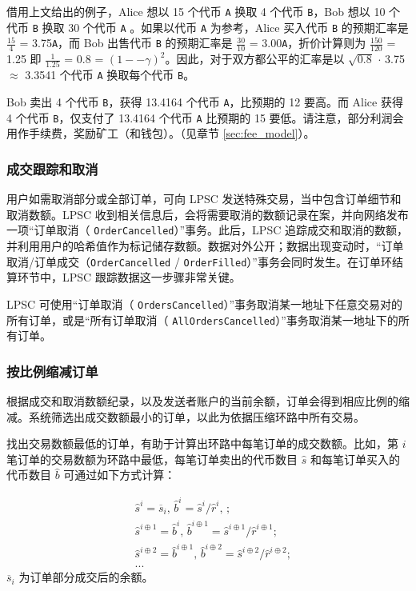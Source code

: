 \documentclass[UTF8,nofonts]{ctexart}%
\begin{document}
\begin{multicols}{2}
借用上文给出的例子，Alice 想以 15 个代币 \verb|A| 换取 4 个代币 \verb|B|，Bob 想以 10 个代币 \verb|B| 换取 30 个代币 \verb|A| 。如果以代币 \verb|A| 为参考，Alice 买入代币 \verb|B| 的预期汇率是 $\frac{15}{4}$ = 3.75\verb|A|，而 Bob 出售代币 \verb|B| 的预期汇率是 $\frac{30}{10}$ = 3.00\verb|A|，折价计算则为 $\frac{150}{120}$ = 1.25 即 $\frac{1}{1.25}$ = 0.8 = $(1 −- \gamma)^2$。因此，对于双方都公平的汇率是以 $\sqrt{0.8}$ $\cdot$ 3.75 $\approx$ 3.3541 个代币 \verb|A| 换取每个代币 \verb|B|。

Bob 卖出 4 个代币 \verb|B|，获得 13.4164 个代币 \verb|A|，比预期的 12 要高。而 Alice 获得 4 个代币 \verb|B|，仅支付了 13.4164 个代币 \verb|A| 比预期的 15 要低。请注意，部分利润会用作手续费，奖励矿工（和钱包）。（见章节  \ref{sec:fee_model}）。


\subsubsection{成交跟踪和取消}

用户如需取消部分或全部订单，可向 LPSC 发送特殊交易，当中包含订单细节和取消数额。LPSC 收到相关信息后，会将需要取消的数额记录在案，并向网络发布一项“订单取消（ \verb|OrderCancelled|）”事务。此后，LPSC 追踪成交和取消的数额，并利用用户的哈希值作为标记储存数额。数据对外公开；数据出现变动时，“订单取消/订单成交（\verb|OrderCancelled| / \verb|OrderFilled|）”事务会同时发生。在订单环结算环节中，LPSC 跟踪数据这一步骤非常关键。

LPSC 可使用“订单取消（ \verb|OrdersCancelled|）”事务取消某一地址下任意交易对的所有订单，或是“所有订单取消（ \verb|AllOrdersCancelled|）”事务取消某一地址下的所有订单。


\subsubsection{按比例缩减订单\label{sec:order_scaling}}
根据成交和取消数额纪录，以及发送者账户的当前余额，订单会得到相应比例的缩减。系统筛选出成交数额最小的订单，以此为依据压缩环路中所有交易。


找出交易数额最低的订单，有助于计算出环路中每笔订单的成交数额。比如，第 $i$笔订单的交易数额为环路中最低，每笔订单卖出的代币数目 $\hat{s}$ 和每笔订单买入的代币数目 $\hat{b}$ 可通过如下方式计算：

\[
\begin{split}
&\hat{s}^{i}=\overline{s}_i\text{, } \hat{b}^{i}=\hat{s}^{i}/ \hat{r}^i\text{, }\text{;}\\
&\hat{s}^{i\oplus 1}=\hat{b}^i\text{, } \hat{b}^{i\oplus 1}=\hat{s}^{i\oplus 1}/ \hat{r}^{i\oplus 1}\text{;}\\
&\hat{s}^{i\oplus 2}=\hat{b}^{i\oplus 1}\text{, } \hat{b}^{i\oplus 2}=\hat{s}^{i\oplus 2}/ \hat{r}^{i\oplus 2}\text{;}\\
& ...
\end{split}
\]
$\overline{s}_i$ 为订单部分成交后的余额。


\end{multicols}
\end{document}
